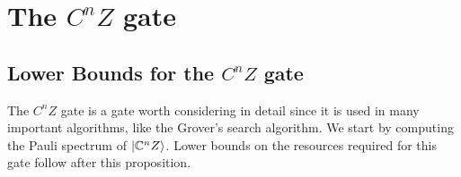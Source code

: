 \documentclass[12pt]{dalthesis}
\begin{document}
%
%
%
%
%
%



\section{The $C^nZ$ gate}
\subsection{Lower Bounds for the $C^nZ$ gate}
The $C^n Z$ gate is a gate worth considering in detail since it is used in many important algorithms, like the Grover's search algorithm. We start by computing the Pauli spectrum of $\ket{\mathbb{C}^nZ}$. Lower bounds on the resources required for this gate follow after this proposition.
\end{document}
